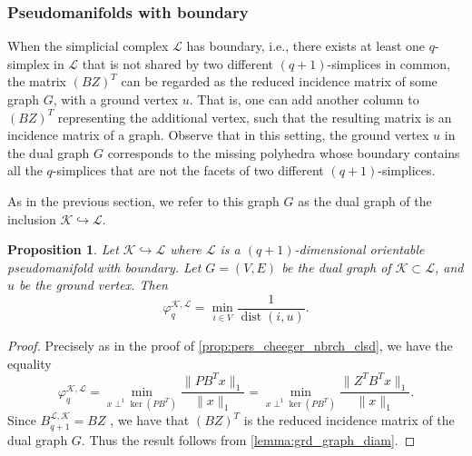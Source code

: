 \documentclass{article}
\newtheorem{proposition}{Proposition}[section]
\newcommand{\KK}{\mathcal{K}}
\newcommand{\LL}{\mathcal{L}}
\newcommand{\dist}{\operatorname{dist}}
\begin{document}
\subsubsection{Pseudomanifolds with boundary}
When the simplicial complex $\LL$ has boundary,
i.e.,
there exists at least one $q$-simplex in $\LL$ that is not shared by two different $(q+1)$-simplices in common, the matrix $(BZ)^T$ can be regarded as the reduced incidence matrix of some graph $G$, with a ground vertex $u$. That is, one can add another column to $(BZ)^T$ representing the additional vertex, such that the resulting matrix is an incidence matrix of a graph. Observe that in this setting, the ground vertex $u$ in the dual graph $G$ corresponds to the missing polyhedra whose boundary contains all the $q$-simplices that are not the facets of two different $(q+1)$-simplices.

As in the previous section, we refer to this graph $G$ as the dual graph of the inclusion $\KK\hookrightarrow \LL$. 

\begin{proposition}\label{prop:pers_cheeger_nobrch_bdry}
Let $\KK\hookrightarrow\LL$ where $\LL$ is a $(q+1)$-dimensional orientable pseudomanifold with boundary. Let $G=(V, E)$ be the dual graph of $\KK\subset \LL$, and $u$ be the ground vertex.
Then 
\begin{equation}\label{eq:cheeger_bdry_non_branching}
\varphi_{q}^{\KK, \LL}
=\min_{i\in V}\frac{1}{\dist(i, u)}.
\end{equation}
\end{proposition}

\begin{proof}
Precisely as in the proof of \cref{prop:pers_cheeger_nbrch_clsd},
we have the equality
\[
 \varphi_{q}^{\KK, \LL}
    =
    \min_{x\perp^1\ker(PB^T)}\frac{\|PB^Tx\|_1}{\|x\|_1}
    =
    \min_{x\perp^1\ker(PB^T)}\frac{\|Z^TB^Tx\|_1}{\|x\|_1}.
    \]
Since $B_{q+1}^{\LL,\KK} = BZ$ \cite[Lemma 3.4]{pers_lap}, we have that $(BZ)^T$ is the reduced incidence matrix of the dual graph $G$. Thus the result follows from \cref{lemma:grd_graph_diam}.
\end{proof}
\end{document}
